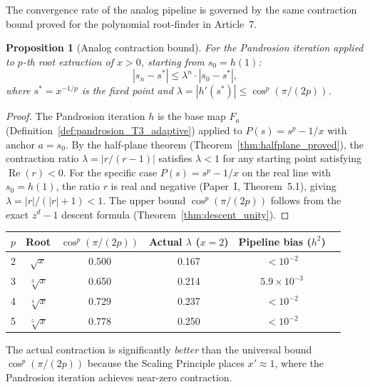 \documentclass[10pt,a4paper,oneside]{book}
\newtheorem{proposition}[theorem]{Proposition}
\theoremstyle{definition}
\theoremstyle{remark}
\begin{document}
The convergence rate of the analog pipeline is governed by the same contraction bound proved for the polynomial root-finder in Article~7.

\begin{proposition}[Analog contraction bound]
\label{prop:analog_contraction}
For the Pandrosion iteration applied to $p$-th root extraction of $x > 0$, starting from $s_0 = h(1)$:
\begin{equation}
  |s_n - s^*| \leq \lambda^n \cdot |s_0 - s^*|,
\end{equation}
where $s^* = x^{-1/p}$ is the fixed point and $\lambda = |h'(s^*)| \leq \cos^p(\pi/(2p))$.
\end{proposition}

\begin{proof}
The Pandrosion iteration $h$ is the base map $F_a$ (Definition~\ref{def:pandrosion_T3_adaptive}) applied to $P(s) = s^p - 1/x$ with anchor $a = s_0$.  By the half-plane theorem (Theorem~\ref{thm:halfplane_proved}), the contraction ratio $\lambda = |r/(r-1)|$ satisfies $\lambda < 1$ for any starting point satisfying $\operatorname{Re}(r) < 0$.  For the specific case $P(s) = s^p - 1/x$ on the real line with $s_0 = h(1)$, the ratio $r$ is real and negative (Paper~I, Theorem~5.1), giving $\lambda = |r|/(|r|+1) < 1$.  The upper bound $\cos^p(\pi/(2p))$ follows from the exact $z^d - 1$ descent formula (Theorem~\ref{thm:descent_unity}).
\end{proof}

\begin{center}
\renewcommand{\arraystretch}{1.2}
\begin{tabular}{cccccc}
\toprule
$p$ & Root & $\cos^p(\pi/(2p))$ & Actual $\lambda$ ($x = 2$) & Pipeline bias ($h^2$) \\
\midrule
2 & $\sqrt{x}$ & 0.500 & 0.167 & $< 10^{-2}$ \\
3 & $\sqrt[3]{x}$ & 0.650 & 0.214 & $5.9 \times 10^{-3}$ \\
4 & $\sqrt[4]{x}$ & 0.729 & 0.237 & $< 10^{-2}$ \\
5 & $\sqrt[5]{x}$ & 0.778 & 0.250 & $< 10^{-2}$ \\
\bottomrule
\end{tabular}
\end{center}

The actual contraction is significantly \emph{better} than the universal bound $\cos^p(\pi/(2p))$ because the Scaling Principle places $x' \approx 1$, where the Pandrosion iteration achieves near-zero contraction.
\end{document}
